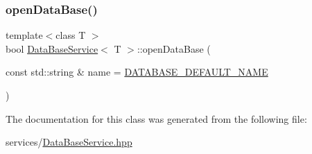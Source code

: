 \mbox{\label{classDataBaseService_a0f1095843e3650701cdd23ae8dbc09d8}} 
\subsubsection{\texorpdfstring{open\+Data\+Base()}{openDataBase()}}
{\footnotesize\ttfamily template$<$class T $>$ \\
bool \mbox{\hyperlink{classDataBaseService}{Data\+Base\+Service}}$<$ T $>$\+::open\+Data\+Base (\begin{DoxyParamCaption}\item[{const std\+::string \&}]{name = {\ttfamily \mbox{\hyperlink{DataBaseService_8hpp_aed391e0e48987704aefc7aa59b508aa7}{D\+A\+T\+A\+B\+A\+S\+E\+\_\+\+D\+E\+F\+A\+U\+L\+T\+\_\+\+N\+A\+ME}}} }\end{DoxyParamCaption})\hspace{0.3cm}{\ttfamily [inline]}}



The documentation for this class was generated from the following file\+:\begin{DoxyCompactItemize}
\item 
services/\mbox{\hyperlink{DataBaseService_8hpp}{Data\+Base\+Service.\+hpp}}\end{DoxyCompactItemize}
